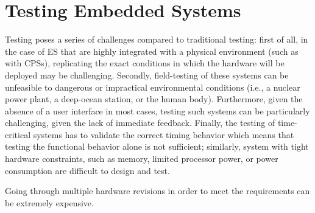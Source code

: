 \section{Testing Embedded Systems}
Testing \ess poses a series of challenges compared to traditional testing: first of all, in the case of ES that are highly integrated with a physical environment (such as with CPSs), replicating the exact conditions in which the hardware will be deployed may be challenging. Secondly, field-testing of these systems can be unfeasible to dangerous or impractical environmental conditions (i.e., a nuclear power plant, a deep-ocean station, or the human body). Furthermore, given the absence of a user interface in most cases, testing such systems can be particularly challenging, given the lack of immediate feedback. Finally, the testing of time-critical systems has to validate the correct timing behavior which means that testing the functional behavior alone is not sufficient; similarly, system with tight hardware constraints, such as memory, limited processor power, or power consumption are difficult to design and test.

Going through multiple hardware revisions in order to meet the requirements can be extremely expensive.

